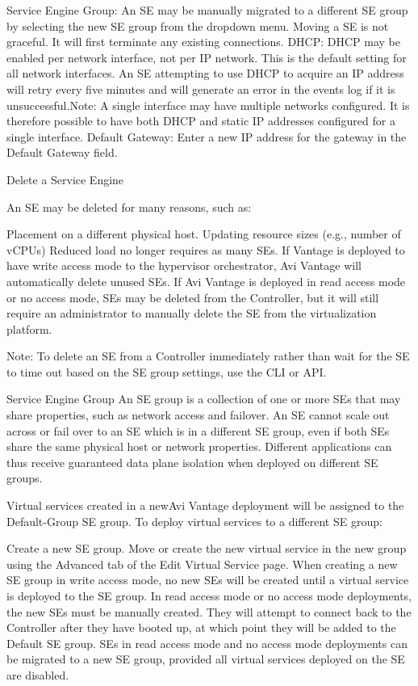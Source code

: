 \documentclass[letterpaper,10pt,english]{sphinxmanual}
\begin{document}
Service Engine Group: An SE may be manually migrated to a different SE group by selecting the new SE group from the dropdown menu. Moving a SE is not graceful. It will first terminate any existing connections.
DHCP: DHCP may be enabled per network interface, not per IP network. This is the default setting for all network interfaces. An SE attempting to use DHCP to acquire an IP address will retry every five minutes and will generate an error in the events log if it is unsuccessful.Note: A single interface may have multiple networks configured. It is therefore possible to have both DHCP and static IP addresses configured for a single interface.
Default Gateway: Enter a new IP address for the gateway in the Default Gateway field.

Delete a Service Engine

An SE may be deleted for many reasons, such as:

Placement on a different physical host.
Updating resource sizes (e.g., number of vCPUs)
Reduced load no longer requires as many SEs.
If Vantage is deployed to have write access mode to the hypervisor orchestrator, Avi Vantage will automatically delete unused SEs. If Avi Vantage is deployed in read access mode or no access mode, SEs may be deleted from the Controller, but it will still require an administrator to manually delete the SE from the virtualization platform.

Note: To delete an SE from a Controller immediately rather than wait for the SE to time out based on the SE group settings, use the CLI or API.

Service Engine Group
An SE group is a collection of one or more SEs that may share properties, such as network access and failover. An SE cannot scale out across or fail over to an SE which is in a different SE group, even if both SEs share the same physical host or network properties. Different applications can thus receive guaranteed data plane isolation when deployed on different SE groups.

Virtual services created in a newAvi Vantage deployment will be assigned to the Default-Group SE group. To deploy virtual services to a different SE group:

Create a new SE group.
Move or create the new virtual service in the new group using the Advanced tab of the Edit Virtual Service page.
When creating a new SE group in write access mode, no new SEs will be created until a virtual service is deployed to the SE group. In read access mode or no access mode deployments, the new SEs must be manually created. They will attempt to connect back to the Controller after they have booted up, at which point they will be added to the Default SE group. SEs in read access mode and no access mode deployments can be migrated to a new SE group, provided all virtual services deployed on the SE are disabled.
\end{document}
